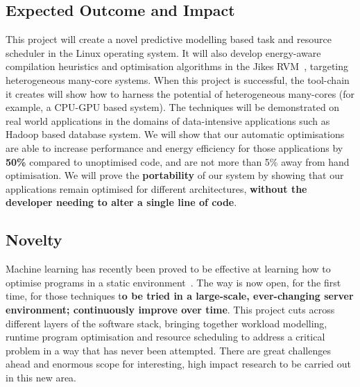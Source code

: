 \subsection{Expected Outcome and Impact}
This project will create a novel predictive modelling based task and resource scheduler in the Linux operating system. It will also develop energy-aware compilation heuristics and optimisation algorithms in the Jikes RVM~\cite{JRVM}, targeting heterogeneous many-core systems.
When this project is successful, the tool-chain it creates will show how to harness the potential of heterogeneous many-cores (for example, a CPU-GPU based system). The techniques will be demonstrated on real world applications in the domains of data-intensive applications such as Hadoop based  database system. We will show that our automatic optimisations are able to increase performance and energy efficiency for those applications by \textbf{50\%} compared to unoptimised code, and are not more than 5\% away from hand optimisation. We will prove the \textbf{portability} of our system by showing that our applications remain optimised for different architectures, \textbf{without the developer needing to alter a single line of code}.

\subsection{Novelty}
Machine learning has recently been proved to be effective at learning how to optimise programs in a static environment~\cite{wangf,wangs}. The way is now open, for the first time, for those techniques t\textbf{o be tried in a large-scale, ever-changing server environment; continuously improve over time}. This project cuts across different layers of the software stack, bringing together workload modelling, runtime program optimisation and resource scheduling to address a critical problem in a way that has never been attempted. There are great challenges ahead and enormous scope for interesting, high impact research to be carried out in this new area.

